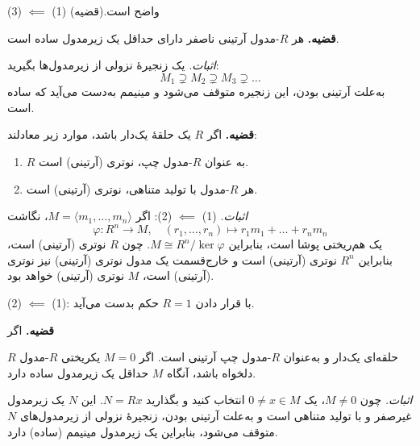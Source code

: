 (3) \(\impliedby\) (1)
واضح است.(قضیه)

\hrulefill

\textbf{قضیه.} هر $R$-مدول آرتینی ناصفر دارای حداقل یک زیرمدول ساده است.

\textit{اثبات.} یک زنجیرهٔ نزولی از زیرمدول‌ها بگیرید:
\[
    M_1 \supsetneq M_2 \supsetneq M_3 \supsetneq \dots
\]
به‌علت آرتینی بودن، این زنجیره متوقف می‌شود و مینیمم به‌دست می‌آید که ساده است.

\hrulefill

\textbf{قضیه.} اگر $R$ یک حلقهٔ یک‌دار باشد، موارد زیر معادلند:
\begin{enumerate}
    \item $R$ به عنوان $R$-مدول چپ، نوترى (آرتینی) است.
    \item هر $R$-مدول با تولید متناهی، نوترى (آرتینی) است.
\end{enumerate}

\textit{اثبات.} (1) $\impliedby$ (2): اگر $M=\langle m_1,\dots,m_n\rangle$، نگاشت
\[
    \varphi: R^n \to M,\quad (r_1,\dots,r_n) \mapsto r_1m_1+\dots+r_nm_n
\]
یک هم‌ریختی پوشا است، بنابراین  $M \cong R^n/\ker\varphi$.
چون $R$ نوترى (آرتینی)
است،‌ بنابراین
$R^n$
نوترى (آرتینی)
است و خارج‌قسمت یک مدول نوترى (آرتینی) نیز نوترى (آرتینی) است، $M$ نوترى (آرتینی) خواهد بود.

(2) $\impliedby$ (1):
با قرار دادن
\(R = 1\)
حکم بدست می‌آید.

\hrulefill

\textbf{قضیه.} اگر 

$R$
حلقه‌ای 
یک‌دار و به‌عنوان 
$R$-مدول
چپ آرتینی است.
اگر
$M=0$
یکریختی
$R$-مدول
دلخواه باشد،
آنگاه $M$ حداقل یک زیرمدول ساده دارد.

\textit{اثبات.} چون $M\neq 0$، یک $0\neq x \in M$ انتخاب کنید و بگذارید $N=Rx$. این $N$ یک زیرمدول غیرصفر و با تولید متناهی است و به‌علت آرتینی بودن، زنجیرهٔ نزولی از زیرمدول‌های $N$ متوقف می‌شود، بنابراین یک زیرمدول مینیمم (ساده) دارد.



